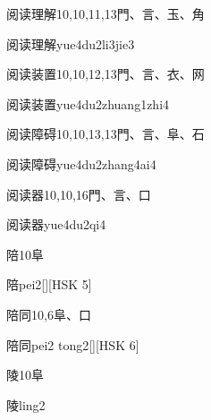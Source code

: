 \begin{Entry}{阅读理解}{10,10,11,13}{⾨、⾔、⽟、⾓}
  \begin{Phonetics}{阅读理解}{yue4du2li3jie3}
  \end{Phonetics}
\end{Entry}

\begin{Entry}{阅读装置}{10,10,12,13}{⾨、⾔、⾐、⽹}
  \begin{Phonetics}{阅读装置}{yue4du2zhuang1zhi4}
  \end{Phonetics}
\end{Entry}

\begin{Entry}{阅读障碍}{10,10,13,13}{⾨、⾔、⾩、⽯}
  \begin{Phonetics}{阅读障碍}{yue4du2zhang4ai4}
  \end{Phonetics}
\end{Entry}

\begin{Entry}{阅读器}{10,10,16}{⾨、⾔、⼝}
  \begin{Phonetics}{阅读器}{yue4du2qi4}
  \end{Phonetics}
\end{Entry}

\begin{Entry}{陪}{10}{⾩}
  \begin{Phonetics}{陪}{pei2}[][HSK 5]
  \end{Phonetics}
\end{Entry}

\begin{Entry}{陪同}{10,6}{⾩、⼝}
  \begin{Phonetics}{陪同}{pei2 tong2}[][HSK 6]
  \end{Phonetics}
\end{Entry}

\begin{Entry}{陵}{10}{⾩}
  \begin{Phonetics}{陵}{ling2}
  \end{Phonetics}
\end{Entry}

